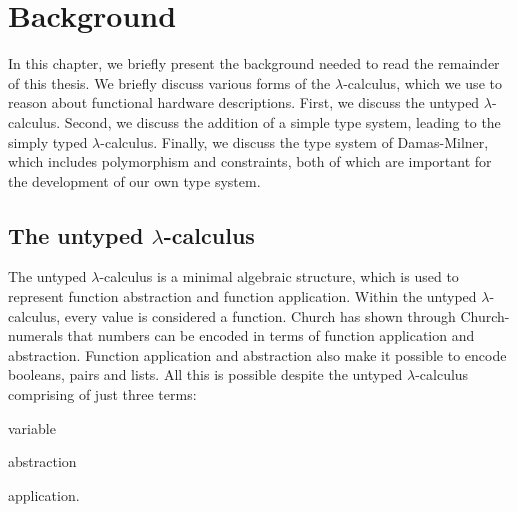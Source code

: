 \newcommand{\framedhslinecorrect}[2]%
  {#1[#2]}

\newcommand{\framedhs}{\sethscode{framedhscode}}


\newenvironment{inlinehscode}%
  {\(\def\column##1##2{}%
   \let\>\undefined\let\<\undefined\let\\\undefined
   \newcommand\>[1][]{}\newcommand\<[1][]{}\newcommand\\[1][]{}%
   \def\fromto##1##2##3{##3}%
   \def\nextline{}}{\) }%

\newcommand{\inlinehs}{\sethscode{inlinehscode}}


\newenvironment{joincode}%
  {\let\orighscode=\hscode
   \let\origendhscode=\endhscode
   \def\endhscode{\def\hscode{\endgroup\def\@currenvir{hscode}\\}\begingroup}
   \orighscode\def\hscode{\endgroup\def\@currenvir{hscode}}}%
  {\origendhscode
   \global\let\hscode=\orighscode
   \global\let\endhscode=\origendhscode}%

\makeatother
\EndFmtInput
%

\chapter{Background} \label{ch:background}
In this chapter, we briefly present the background needed to read the remainder of this thesis.
We briefly discuss various forms of the $\lambda$-calculus, which we use to reason about functional hardware descriptions.
First, we discuss the untyped $\lambda$-calculus.
Second, we discuss the addition of a simple type system, leading to the simply typed $\lambda$-calculus.
Finally, we discuss the type system of Damas-Milner, which includes polymorphism and constraints, both of which are important for the development of our own type system.

\section{The untyped $\lambda$-calculus}
The untyped $\lambda$-calculus is a minimal algebraic structure, which is used to represent function abstraction and function application.
Within the untyped $\lambda$-calculus, every value is considered a function.
Church has shown through Church-numerals that numbers can be encoded in terms of function application and abstraction.
Function application and abstraction also make it possible to encode booleans, pairs and lists.
All this is possible despite the untyped $\lambda$-calculus comprising of just three terms:
\begin{itemize*}
 \item variable
 \item abstraction
 \item application.
\end{itemize*}

